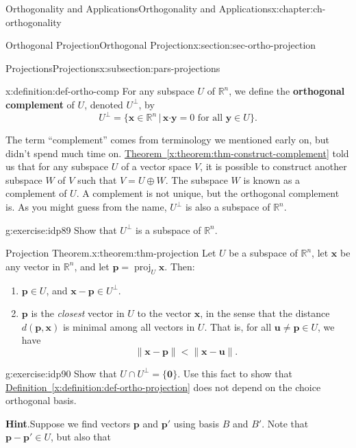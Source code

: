 \documentclass[oneside,10pt,]{book}
\newcommand{\blocktitlefont}{\relax}
\newcommand{\xreffont}{\relax}
\newcommand{\terminology}[1]{\textbf{#1}}
\numberwithin{equation}{section}
\newcommand{\R}{\mathbb{R}}
\newcommand{\dotp}{\!\boldsymbol{\cdot}\!}
\newcommand{\len}[1]{\lVert #1\rVert}
\newcommand{\proj}[2]{\operatorname{proj}_{#1}{#2}}
\newcommand{\uu}{\mathbf{u}}
\newcommand{\xx}{\mathbf{x}}
\newcommand{\yy}{\mathbf{y}}
\newcommand{\lt}{<}
\begin{document}
\begin{chapterptx}{Orthogonality and Applications}{}{Orthogonality and Applications}{}{}{x:chapter:ch-orthogonality}
\begin{sectionptx}{Orthogonal Projection}{}{Orthogonal Projection}{}{}{x:section:sec-ortho-projection}
\begin{subsectionptx}{Projections}{}{Projections}{}{}{x:subsection:pars-projections}
\begin{definition}{}{x:definition:def-ortho-comp}
For any subspace \(U\) of \(\R^n\), we define the \terminology{orthogonal complement} of \(U\), denoted \(U^\bot\), by%
\begin{equation*}
U^\bot = \{\xx\in\R^n \,|\, \xx\dotp\yy = 0 \text{ for all } \yy\in U\}\text{.}
\end{equation*}
%
\end{definition}
The term ``complement'' comes from terminology we mentioned early on, but didn't spend much time on. \hyperref[x:theorem:thm-construct-complement]{Theorem~{\xreffont\ref{x:theorem:thm-construct-complement}}} told us that for any subspace \(U\) of a vector space \(V\), it is possible to construct another subspace \(W\) of \(V\) such that \(V = U\oplus W\). The subspace \(W\) is known as a complement of \(U\). A complement is not unique, but the orthogonal complement is. As you might guess from the name, \(U^\bot\) is also a subspace of \(\R^n\).%
\begin{inlineexercise}{}{g:exercise:idp89}%
Show that \(U^\bot\) is a subspace of \(\R^n\).%
\end{inlineexercise}%
\begin{theorem}{Projection Theorem.}{}{x:theorem:thm-projection}%
Let \(U\) be a subspace of \(\R^n\), let \(\xx\) be any vector in \(\R^n\), and let \(\mathbf{p}=\proj{U}{\xx}\). Then:%
\begin{enumerate}
\item{}\(\mathbf{p}\in U\), and \(\xx-\mathbf{p}\in U^\bot\).%
\item{}\(\mathbf{p}\) is the \emph{closest} vector in \(U\) to the vector \(\xx\), in the sense that the distance \(d(\mathbf{p},\xx)\) is minimal among all vectors in \(U\). That is, for all \(\uu\neq \mathbf{p}\in U\), we have%
\begin{equation*}
\len{\xx-\mathbf{p}}\lt\len{\xx-\uu}\text{.}
\end{equation*}
%
\end{enumerate}
%
\end{theorem}
\begin{inlineexercise}{}{g:exercise:idp90}%
Show that \(U\cap U^\bot = \{\mathbf{0}\}\). Use this fact to show that \hyperref[x:definition:def-ortho-projection]{Definition~{\xreffont\ref{x:definition:def-ortho-projection}}} does not depend on the choice orthogonal basis.%
\par\smallskip%
\noindent\textbf{\blocktitlefont Hint}.\hypertarget{g:hint:idp91}{}\quad{}Suppose we find vectors \(\mathbf{p}\) and \(\mathbf{p}'\) using basis \(B\) and \(B'\). Note that \(\mathbf{p}-\mathbf{p}'\in U\), but also that%

\end{inlineexercise}
\end{subsectionptx}
\end{sectionptx}
\end{chapterptx}
\end{document}
